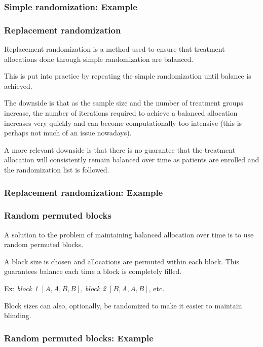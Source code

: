 \documentclass{beamer}
\begin{document}
\begin{frame}[fragile]
    \frametitle{Simple randomization: Example}
	
\end{frame}


\begin{frame}
    \frametitle{Replacement randomization}
	Replacement randomization is a method used to ensure that treatment allocations
	done through simple randomization are balanced.
	
	\bigskip
	
	This is put into practice by repeating the simple randomization until balance is achieved.
	
	\bigskip
	
	The downside is that as the sample size and the number of treatment groups increase, the number
	of iterations required to achieve a balanced allocation increases very quickly and can
	become computationally too intensive (this is perhaps not much of an issue nowadays).
	
	\bigskip
	
	A more relevant downside is that there is no guarantee that the treatment allocation will
	consistently remain balanced over time as patients are enrolled and the randomization
	list is followed.
\end{frame}


\begin{frame}[fragile]
    \frametitle{Replacement randomization: Example}
	
\end{frame}


\begin{frame}
    \frametitle{Random permuted blocks}
	A solution to the problem of maintaining balanced allocation over time is to use random permuted blocks.

    \bigskip

    A block size is chosen and allocations are permuted within each block.
    This guarantees balance each time a block is completely filled.

    \bigskip

    Ex: \emph{block 1} $[A, A, B, B]$, \emph{block 2} $[B, A, A, B]$, etc.

    \bigskip

    Block sizes can also, optionally, be randomized to make it easier to maintain blinding.
\end{frame}


\begin{frame}[fragile]
    \frametitle{Random permuted blocks: Example}
	
\end{frame}
\end{document}
